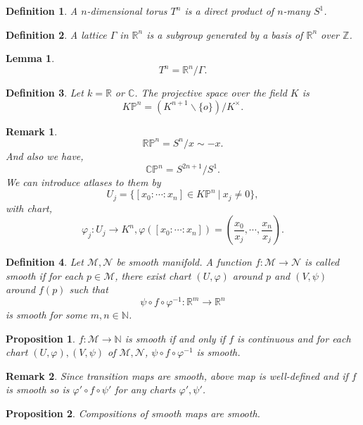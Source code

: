 \documentclass[8pt]{article}
\newtheorem{proposition}{Proposition}[section]
\newtheorem{definition}{Definition}[section]
\newtheorem{lemma}{Lemma}[section]
\newtheorem{remark}{Remark}[section]
\newcommand{\N}[0]{\mathbb{N}}
\newcommand{\R}[0]{\mathbb{R}}
\newcommand{\Z}[0]{\mathbb{Z}}
\newcommand{\C}[0]{\mathbb{C}}
\newcommand{\Para}[0]{\mathbb{P}}
\newcommand{\M}[0]{\mathcal{M}}
\newcommand{\maniN}[0]{\mathcal{N}}
\newcommand{\sep}[0]{\:|\:}
\begin{document}
\begin{definition}
  A $n$-dimensional torus $T^n$ is a direct product of $n$-many $S^1$. 
\end{definition}

\begin{definition}
  A lattice $\Gamma$ in $\R^n$ is a subgroup generated by a basis of $\R^n$ over $\Z$. 
\end{definition}

\begin{lemma}
\begin{equation*}
  T^n = \R^n/\Gamma. 
\end{equation*}
\end{lemma}

\begin{definition}
  Let $k=\R$ or $\C$. The projective space over the field $K$ is 
  \begin{equation*}
    K\Para^n=(K^{n+1}\backslash\{o\})/K^\times.
  \end{equation*}
\end{definition}
\begin{remark}
  \begin{equation*}
    \R\Para^n = S^n/x\sim-x.
  \end{equation*}
  And also we have,
  \begin{equation*}
    \C\Para^n = S^{2n+1}/S^1.
  \end{equation*}
  We can introduce atlases to them by 
  \begin{equation*}
    U_j = \{[x_0:\cdots:x_n]\in K\Para^n\sep x_j\not=0\},
  \end{equation*}
  with chart,
  \begin{equation*}
    \varphi_j:U_j\to K^n, \varphi([x_0:\cdots:x_n]) = \left({\frac {x_0} {x_j}},\cdots,{\frac {x_n} {x_j}}\right).
  \end{equation*}
\end{remark}
\begin{definition}
  Let $\mathcal{M},\mathcal{N}$ be smooth manifold. A function $f:\mathcal{M}\to\mathcal{N}$ is called smooth if for each $p\in\mathcal{M}$, there exist chart $(U,\varphi)$ around $p$ and $(V,\psi)$ around $f(p)$ such that 
  \begin{equation*}
    \psi\circ f\circ \varphi^{-1}:\R^m \to \R^n
  \end{equation*}
  is smooth for some $m,n\in\N$. 
\end{definition}

\begin{proposition}
  $f:\M\to\N$ is smooth if and only if $f$ is continuous and for each chart $(U,\varphi),(V,\psi)$ of $\M,\maniN$, $\psi\circ f\circ\varphi^{-1}$ is smooth.
\end{proposition}
\begin{remark}
  Since transition maps are smooth, above map is well-defined and if $f$ is smooth so is $\varphi'\circ f\circ \psi'$ for any charts $\varphi',\psi'$. 
\end{remark}
\begin{proposition}
  Compositions of smooth maps are smooth.
\end{proposition}
\end{document}
